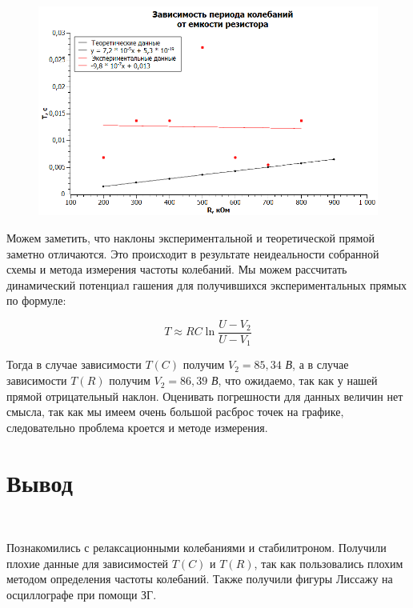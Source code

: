 \documentclass[11pt]{article}
\begin{document}
\begin{figure}[h!]
\centering
\includegraphics[scale=1]{Graph3.png}
\label{fig:Image1}
\end{figure}

\newpage

Можем заметить, что наклоны экспериментальной и теоретической прямой заметно отличаются. Это происходит в результате неидеальности собранной схемы и метода измерения частоты колебаний. Мы можем рассчитать динамический потенциал гашения для получившихся экспериментальных прямых по формуле:

\[T \approx RC \ln \frac{U - V_2}{U - V_1}\]

Тогда в случае зависимости $T(C)$ получим $V_2 = 85,34$ \textit{В}, а в случае зависимости $T(R)$ получим $V_2 = 86,39$ \textit{В}, что ожидаемо, так как у нашей прямой отрицательный наклон. Оценивать погрешности для данных величин нет смысла, так как мы имеем очень большой расброс точек на графике, следовательно проблема кроется и методе измерения.

\section*{Вывод}\

Познакомились с релаксационными колебаниями и стабилитроном. Получили плохие данные для зависимостей $T(C)$ и $T(R)$, так как пользовались плохим методом определения частоты колебаний. Также получили фигуры Лиссажу на осциллографе при помощи ЗГ.
\end{document}
